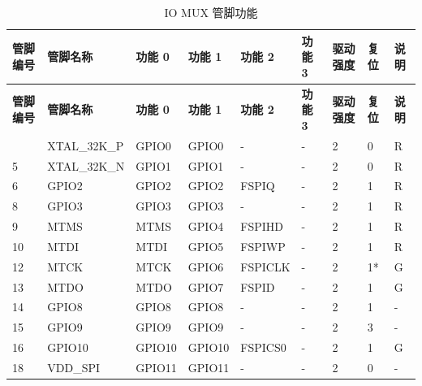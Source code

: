 
   \begin{longtable}[c]{|p{1.5cm}|p{1.9cm}|p{1.5cm}|p{1.5cm}|p{1.5cm}|p{1.5cm}|p{1.0cm}|p{1.0cm}|p{1.0cm}| }
   \caption{IO MUX 管脚功能}
    \label{tab:iomuxgpio-pin-functions} \\
        \hline
        \rowcolor{lightgray}
\textbf{管脚编号} & \textbf{管脚名称} & \textbf{功能 0} & \textbf{功能 1} & \textbf{功能 2} & \textbf{功能 3} & \textbf{驱动强度} & \textbf{复位} & \textbf{说明} \\
 \hline
\endfirsthead
        \hline
        \rowcolor{lightgray}
        \textbf{管脚编号} & \textbf{管脚名称} & \textbf{功能 0} & \textbf{功能 1} & \textbf{功能 2} & \textbf{功能 3} & \textbf{驱动强度} & \textbf{复位} & \textbf{说明} \\
        \hline
        \endhead
        \endfoot
4 & XTAL\_32K\_P     & GPIO0         & GPIO0   & -          & -            & 2           & 0 & R \\ \hline
5 & XTAL\_32K\_N     & GPIO1         & GPIO1   & -          & -            & 2           & 0 & R \\ \hline
6 & GPIO2            & GPIO2         & GPIO2   & FSPIQ      & -            & 2           & 1 & R \\ \hline
8 & GPIO3            & GPIO3         & GPIO3   & -          & -            & 2           & 1 & R \\ \hline
9 & MTMS             & MTMS          & GPIO4   & FSPIHD     & -            & 2           & 1 & R \\ \hline
10 & MTDI             & MTDI          & GPIO5   & FSPIWP     & -            & 2           & 1 & R \\ \hline
12 & MTCK             & MTCK          & GPIO6   & FSPICLK    & -            & 2           & 1* & G \\ \hline
13 & MTDO             & MTDO          & GPIO7   & FSPID      & -            & 2           & 1 & G \\ \hline
14 & GPIO8            & GPIO8         & GPIO8   & -          & -            & 2           & 1 & - \\ \hline
15 & GPIO9            & GPIO9         & GPIO9   & -          & -            & 2           & 3 & - \\ \hline
16 & GPIO10          &  GPIO10       & GPIO10  & FSPICS0    & -            & 2           & 1 & G \\ \hline
18 & VDD\_SPI        &  GPIO11       & GPIO11  & -          & -            & 2           & 0 & - \\ \hline

\end{longtable}
